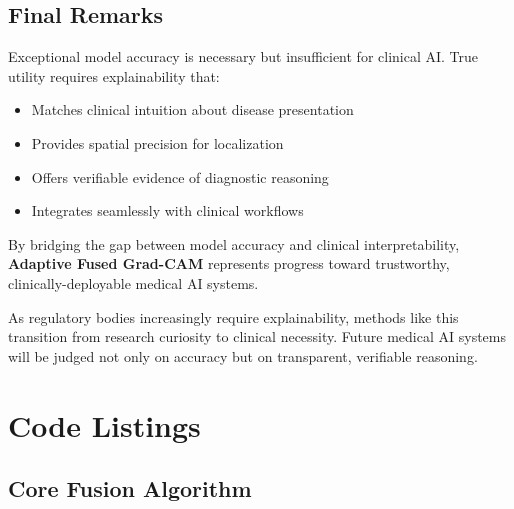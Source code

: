 \documentclass[12pt,a4paper,oneside]{book}
\begin{document}
\section{Final Remarks}

Exceptional model accuracy is necessary but insufficient for clinical AI. True utility requires explainability that:

\begin{itemize}
  \item Matches clinical intuition about disease presentation
  \item Provides spatial precision for localization
  \item Offers verifiable evidence of diagnostic reasoning
  \item Integrates seamlessly with clinical workflows
\end{itemize}

By bridging the gap between model accuracy and clinical interpretability, \textbf{Adaptive Fused Grad-CAM} represents progress toward trustworthy, clinically-deployable medical AI systems.

As regulatory bodies increasingly require explainability, methods like this transition from research curiosity to clinical necessity. Future medical AI systems will be judged not only on accuracy but on transparent, verifiable reasoning.

\appendix

\chapter{Code Listings}
\label{app:code}

\section{Core Fusion Algorithm}
\end{document}
